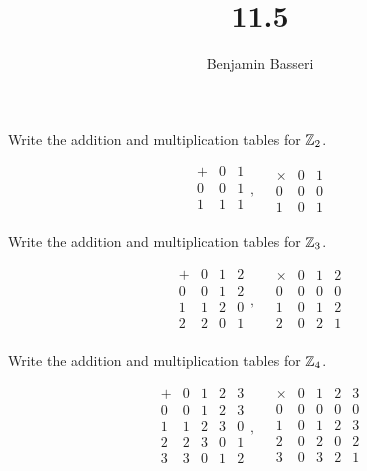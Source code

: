 \documentclass{article}
\title{11.5}
\author{Benjamin Basseri}
\begin{document}
\maketitle

\begin{problem}
Write the addition and multiplication tables for $\mathbb{Z}_2$.
\end{problem}

$$\begin{array}{c|cc}
    + & 0 & 1 \\
    \hline
    0 & 0 & 1 \\
    1 & 1 & 1 \\
  \end{array}, \quad
  \begin{array}{c|cc}
    \times & 0 & 1 \\
    \hline
    0      & 0 & 0 \\
    1      & 0 & 1
  \end{array}$$

\begin{problem}
Write the addition and multiplication tables for $\mathbb{Z}_3$.
\end{problem}

$$\begin{array}{c|ccc}
    + & 0 & 1 & 2 \\
    \hline
    0 & 0 & 1 & 2 \\
    1 & 1 & 2 & 0 \\
    2 & 2 & 0 & 1 \\
  \end{array}, \quad
  \begin{array}{c|ccc}
    \times & 0 & 1 & 2 \\
    \hline
    0      & 0 & 0 & 0 \\
    1      & 0 & 1 & 2 \\
    2      & 0 & 2 & 1 \\
  \end{array}$$

\begin{problem}
Write the addition and multiplication tables for $\mathbb{Z}_4$.
\end{problem}

$$\begin{array}{c|cccc}
    + & 0 & 1 & 2 & 3 \\
    \hline
    0 & 0 & 1 & 2 & 3 \\
    1 & 1 & 2 & 3 & 0 \\
    2 & 2 & 3 & 0 & 1 \\
    3 & 3 & 0 & 1 & 2 \\
  \end{array}, \quad
  \begin{array}{c|cccc}
    \times & 0 & 1 & 2 & 3 \\
    \hline
    0      & 0 & 0 & 0 & 0 \\
    1      & 0 & 1 & 2 & 3 \\
    2      & 0 & 2 & 0 & 2 \\
    3      & 0 & 3 & 2 & 1 \\
  \end{array}$$
\end{document}
